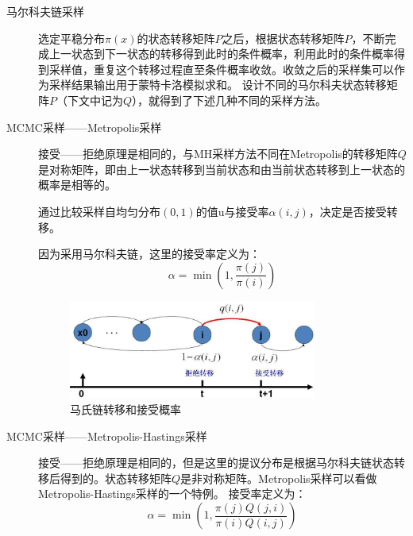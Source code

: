 \documentclass{ctexart}
\begin{document}
\begin{description}
\item[马尔科夫链采样]
选定平稳分布$\pi \left(x\right)$的状态转移矩阵$P$之后，根据状态转移矩阵$P$，不断完成上一状态到下一状态的转移得到此时的条件概率，利用此时的条件概率得到采样值，重复这个转移过程直至条件概率收敛。收敛之后的采样集可以作为采样结果输出用于蒙特卡洛模拟求和。
设计不同的马尔科夫状态转移矩阵$P$（下文中记为$Q$），就得到了下述几种不同的采样方法。

\item[MCMC采样——Metropolis采样]
接受——拒绝原理是相同的，与MH采样方法不同在Metropolis的转移矩阵$Q$是对称矩阵，即由上一状态转移到当前状态和由当前状态转移到上一状态的概率是相等的。

通过比较采样自均匀分布$\left(0,1\right)$的值u与接受率$\alpha\left(i,j\right)$，决定是否接受转移。

因为采用马尔科夫链，这里的接受率定义为：
\begin{equation}
\alpha = \min\left(1,\frac{\pi\left(j\right)}{\pi\left(i\right)}\right)
\end{equation}

\begin{figure}[H]
\begin{center}
\includegraphics[width=0.8\textwidth]{fig/mc-trans.png} %
\caption{马氏链转移和接受概率}
\end{center}
\end{figure}



\item[MCMC采样——Metropolis-Hastings采样]
接受——拒绝原理是相同的，但是这里的提议分布是根据马尔科夫链状态转移后得到的。状态转移矩阵$Q$是非对称矩阵。Metropolis采样可以看做Metropolis-Hastings采样的一个特例。
接受率定义为：
\begin{equation}
\alpha = \min\left(1,\frac{\pi\left(j\right)Q\left(j,i\right)}{\pi\left(i\right)Q\left(i,j\right)}\right)
\end{equation}



\end{description}
\end{document}
